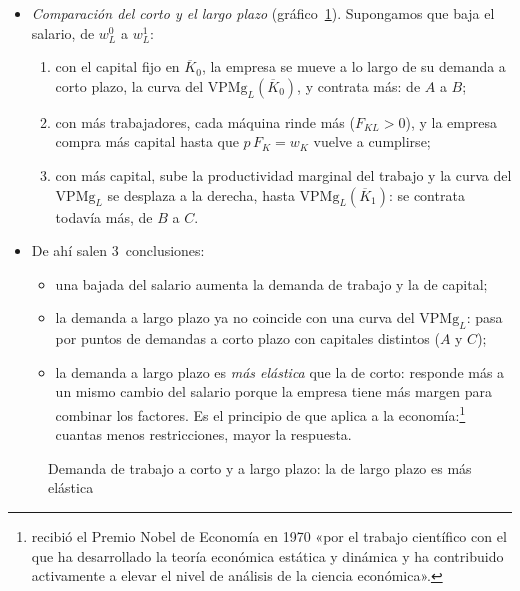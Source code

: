 \documentclass[11pt]{article}
\begin{document}
\begin{itemize}
\item \emph{Comparación del corto y el largo plazo} (gráfico~\ref{fig:demanda-lp-cp}). Supongamos que baja el salario, de $w_L^0$ a $w_L^1$:
  \begin{enumerate}
  \item con el capital fijo en $\overline{K}_0$, la empresa se mueve a lo largo de su demanda a corto plazo, la curva del $\mathrm{VPMg}_L(\overline{K}_0)$, y contrata más: de $A$ a $B$;
  \item con más trabajadores, cada máquina rinde más ($F_{KL}>0$), y la empresa compra más capital hasta que $p\,F_K=w_K$ vuelve a cumplirse;
  \item con más capital, sube la productividad marginal del trabajo y la curva del $\mathrm{VPMg}_L$ se desplaza a la derecha, hasta $\mathrm{VPMg}_L(\overline{K}_1)$: se contrata todavía más, de $B$ a $C$.
  \end{enumerate}
\item De ahí salen 3~conclusiones:
  \begin{itemize}
  \item una bajada del salario aumenta la demanda de trabajo y la de capital;
  \item la demanda a largo plazo ya no coincide con una curva del $\mathrm{VPMg}_L$: pasa por puntos de demandas a corto plazo con capitales distintos ($A$ y $C$);
  \item la demanda a largo plazo es \emph{más elástica} que la de corto: responde más a un mismo cambio del salario porque la empresa tiene más margen para combinar los factores. Es el principio de  que \textcite{Samuelson1947Foundations} aplica a la economía:\footnote{ recibió el Premio Nobel de Economía en 1970 «por el trabajo científico con el que ha desarrollado la teoría económica estática y dinámica y ha contribuido activamente a elevar el nivel de análisis de la ciencia económica»\nocite{Nobel1970Samuelson}.} cuantas menos restricciones, mayor la respuesta.
  \end{itemize}
\end{itemize}

\begin{figure}[H]
\centering
\caption{Demanda de trabajo a corto y a largo plazo: la de largo plazo es más elástica}\label{fig:demanda-lp-cp}
\end{figure}
\end{document}
